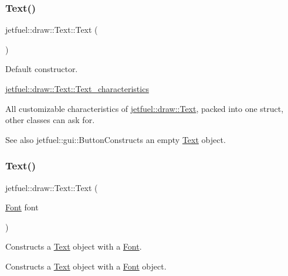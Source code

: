 \subsubsection{\texorpdfstring{Text()}{Text()}\hspace{0.1cm}{\footnotesize\ttfamily [1/2]}}
{\footnotesize\ttfamily jetfuel\+::draw\+::\+Text\+::\+Text (\begin{DoxyParamCaption}{ }\end{DoxyParamCaption})\hspace{0.3cm}{\ttfamily [inline]}}



Default constructor. 

\hyperlink{structjetfuel_1_1draw_1_1Text_1_1Text__characteristics}{jetfuel\+::draw\+::\+Text\+::\+Text\+\_\+characteristics}

All customizable characteristics of \hyperlink{classjetfuel_1_1draw_1_1Text}{jetfuel\+::draw\+::\+Text}, packed into one struct, other classes can ask for.

\begin{DoxySeeAlso}{See also}
jetfuel\+::gui\+::\+Button\+Constructs an empty \hyperlink{classjetfuel_1_1draw_1_1Text}{Text} object. 
\end{DoxySeeAlso}
\mbox{\label{classjetfuel_1_1draw_1_1Text_a792d23b62a66af2558bc7165e5419992}} 
\subsubsection{\texorpdfstring{Text()}{Text()}\hspace{0.1cm}{\footnotesize\ttfamily [2/2]}}
{\footnotesize\ttfamily jetfuel\+::draw\+::\+Text\+::\+Text (\begin{DoxyParamCaption}\item[{\hyperlink{classjetfuel_1_1draw_1_1Font}{Font}}]{font }\end{DoxyParamCaption})}



Constructs a \hyperlink{classjetfuel_1_1draw_1_1Text}{Text} object with a \hyperlink{classjetfuel_1_1draw_1_1Font}{Font}. 

Constructs a \hyperlink{classjetfuel_1_1draw_1_1Text}{Text} object with a \hyperlink{classjetfuel_1_1draw_1_1Font}{Font} object.


